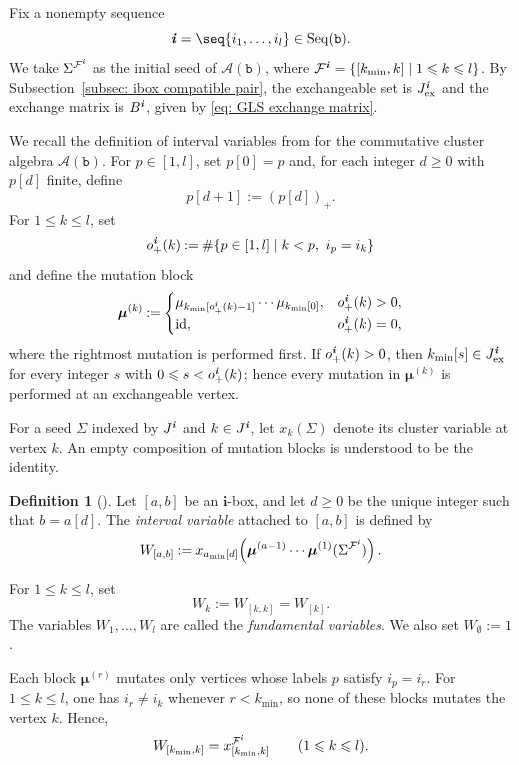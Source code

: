 \documentclass[12pt, leqno]{amsart}
\numberwithin{equation}{section}
\theoremstyle{plain}
\theoremstyle{definition}
\newtheorem{definition}[lemma]{Definition}
\renewcommand{\le}{\leqslant}
\renewcommand{\ge}{\geqslant}
\newcommand{\seteq}{\mathbin{:=}}
\newcommand{\ex}{\mathrm{ex}}
\newcommand{\ii}{ \textbf{\textit{i}}}
\newcommand{\bmu}{{\boldsymbol{\mu}}}
\newcommand{\bfi}{\mathbf{i}}
\newcommand{\calA}{\mathcal{A}}
\newcommand{\calF}{\mathcal{F}}
\newcommand{\ttb}{\mathtt{b}}
\newcommand{\Seq}{\mathrm{Seq}}
\begin{document}
Fix a nonempty sequence
\[
\ii=\seq{i_1,\ldots,i_l}\in\Seq(\ttb).
\]
We take $\Sigma^{\calF^\ii}$ as the initial seed of $\calA(\ttb)$,
where $\calF^\ii=\{[k_{\min},k]\mid1\le k\le l\}$.
By Subsection~\ref{subsec: ibox compatible pair}, the exchangeable set
is $J^\ii_{\ex}$ and the exchange matrix is $B^\ii$, given by
\eqref{eq: GLS exchange matrix}.

We recall the definition of interval variables from \cite{Qin24A}
for the commutative cluster algebra $\calA(\ttb)$.
For $p\in[1,l]$, set $p[0]=p$ and, for each integer $d\ge0$ with
$p[d]$ finite, define
\[
p[d+1]\seteq(p[d])_+.
\]
For $1\le k\le l$, set
\[
o_+^\ii(k)\seteq\#\{p\in[1,l]\mid k<p,\ i_p=i_k\}
\]
and define the mutation block
\begin{equation} \label{eq: mutation block}
\bmu^{(k)}\seteq
\begin{cases}
\mu_{k_{\min}[o_+^\ii(k)-1]}\cdots\mu_{k_{\min}[0]},
&o_+^\ii(k)>0,\\
\operatorname{id},&o_+^\ii(k)=0,
\end{cases}    
\end{equation}
where the rightmost mutation is performed first.  If
$o_+^\ii(k)>0$, then $k_{\min}[s]\in J^\ii_{\ex}$ for every integer
$s$ with $0\le s<o_+^\ii(k)$; hence every mutation in $\bmu^{(k)}$ is
performed at an exchangeable vertex.

For a seed $\Sigma$ indexed by $J^\ii$ and $k\in J^\ii$, let
$x_k(\Sigma)$ denote its cluster variable at vertex $k$.
An empty composition of mutation blocks is understood to be the
identity.

\begin{definition}[{\cite[Definition~8.3]{Qin24A}}]
\label{def: Qin interval and fundamental variables}
Let $[a,b]$ be an $\bfi$-box, and let $d\ge0$ be the unique integer
such that $b=a[d]$.  The \emph{interval variable} attached to $[a,b]$
is defined by
\[
W_{[a,b]}\seteq
x_{a_{\min}[d]}\!\left(
\bmu^{(a-1)}\cdots\bmu^{(1)}(\Sigma^{\calF^\ii})
\right).
\]

For $1\le k\le l$, set
\[
W_k\seteq W_{[k,k]}=W_{[k]}.
\]
The variables $W_1,\ldots,W_l$ are called the
\emph{fundamental variables}.
We also set $W_\emptyset\seteq1$.
\end{definition}

Each block $\bmu^{(r)}$ mutates only vertices whose labels $p$
satisfy $i_p=i_r$.
For $1\le k\le l$, one has $i_r\ne i_k$ whenever $r<k_{\min}$, so
none of these blocks mutates the vertex $k$.  Hence,
\begin{equation}
W_{[k_{\min},k]}=x^{\calF^\ii}_{[k_{\min},k]}
\qquad
(1\le k\le l).
\label{eq: Qin initial interval variables}
\end{equation}
\end{document}
